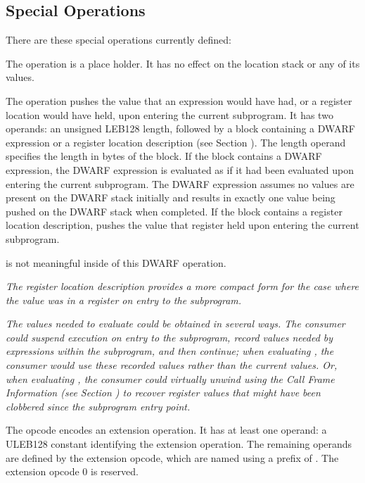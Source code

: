 \subsection{Special Operations}
\label{chap:specialoperations}
There
are these special operations currently defined:
\begin{enumerate}[1. ]
\itembfnl{\DWOPnopTARG}
The \DWOPnopNAME{} operation is a place holder. It has no effect
on the location stack or any of its values.

\itembfnl{\DWOPentryvalueTARG}
The \DWOPentryvalueNAME{} operation pushes
the value that
\bb
an expression would have had, or a register location would have held,
\eb
upon entering the current subprogram.  It has two operands: an
unsigned LEB128 length, followed by
a block containing a DWARF expression or a register location description
(see Section ).
The length operand specifies the length in bytes of the block.
If the block contains a DWARF expression,
the DWARF expression is evaluated as if it had been evaluated upon entering
the current subprogram.  The DWARF expression
assumes no values are present on the DWARF stack initially and results
in exactly one value being pushed on the DWARF stack when completed.
If the block contains a register location
description, \DWOPentryvalueNAME{} pushes the value that register
\bb
held
\eb
upon entering the current subprogram.

\DWOPpushobjectaddress{} is not meaningful inside of this DWARF operation.

\textit{The register location description provides a more compact form for the
case where the value was in a register on entry to the subprogram.}

\textit{The values needed to evaluate \DWOPentryvalueNAME{} could be obtained in
several ways. The consumer could suspend execution on entry to the
subprogram, record values needed by \DWOPentryvalueNAME{} expressions within
the subprogram, and then continue; when evaluating \DWOPentryvalueNAME{},
the consumer would use these recorded values rather than the current
values.  Or, when evaluating \DWOPentryvalueNAME{}, the consumer could
virtually unwind using the Call Frame Information
(see Section )
to recover register values that might have been clobbered since the
subprogram entry point.}

\bb
\itembfnl{\DWOPextendedTARG}
The \DWOPextendedNAME{} opcode encodes an extension operation. It has
at least one operand: a ULEB128 constant identifying the extension operation.
The remaining operands are defined by the extension opcode, which are named
using a prefix of \DWOPEXT.
The extension opcode 0 is reserved.
\eb


\end{enumerate}
